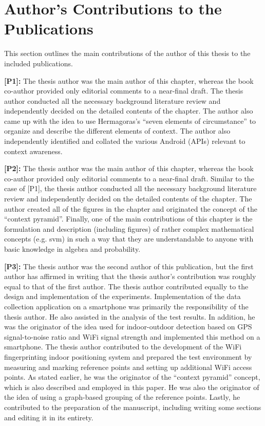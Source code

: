 \section{Author's Contributions to the Publications}
\label{sec:author_contributions}

This section outlines the main contributions of the author of this thesis to the included publications.

\textbf{[P1]:} The thesis author was the main author of this chapter, whereas the book co-author provided only editorial comments to a near-final draft. The thesis author conducted all the necessary background literature review and independently decided on the detailed contents of the chapter. The author also came up with the idea to use Hermagoras's ``seven elements of circumstance'' to organize and describe the different elements of context. The author also independently identified and collated the various Android  (APIs) relevant to context awareness.

\textbf{[P2]:} The thesis author was the main author of this chapter, whereas the book co-author provided only editorial comments to a near-final draft. Similar to the case of [P1], the thesis author conducted all the necessary background literature review and independently decided on the detailed contents of the chapter. The author created all of the figures in the chapter and originated the concept of the ``context pyramid''. Finally, one of the main contributions of this chapter is the formulation and description (including figures) of rather complex mathematical concepts (e.g. \acrlong{svm}) in such a way that they are understandable to anyone with basic knowledge in algebra and probability.

\textbf{[P3]:} The thesis author was the second author of this publication, but the first author has affirmed in writing that the thesis author's contribution was roughly equal to that of the first author. The thesis author contributed equally to the design and implementation of the experiments. Implementation of the data collection application on a smartphone was primarily the responsibility of the thesis author. He also assisted in the analysis of the test results. In addition, he was the originator of the idea used for indoor-outdoor detection based on GPS signal-to-noise ratio and WiFi signal strength and implemented this method on a smartphone. The thesis author contributed to the development of the WiFi fingerprinting indoor positioning system and prepared the test environment by measuring and marking reference points and setting up additional WiFi access points. As stated earlier, he was the originator of the ``context pyramid'' concept, which is also described and employed in this paper. He was also the originator of the idea of using a graph-based grouping of the reference points. Lastly, he contributed to the preparation of the manuscript, including writing some sections and editing it in its entirety.

